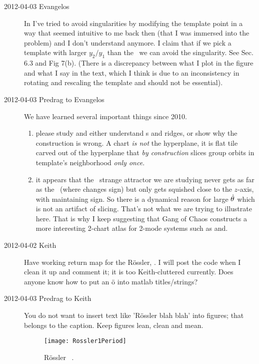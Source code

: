 \begin{description}
\item[2012-04-03 Evangelos]
In  I've tried to avoid singularities by modifying the
template point in a way that seemed intuitive to me back then (that I was immersed
into the problem) and I don't understand anymore. I claim that if we pick a template
with larger $y_2/y_1$ than the \reqv\ we can avoid
the singularity. See Sec. 6.3 and Fig 7(b).
(There is a discrepancy between what I plot in the figure and what I say in the
text, which I think is due to an inconsistency in rotating and rescaling the
template and should not be essential).

\item[2012-04-03 Predrag to Evangelos] We have learned several important things since
2010.
\begin{enumerate}
  \item
    please study and either understand \chartBord s and ridges, or show
    why the construction is wrong. A chart \emph{is not} the hyperplane,
    it is flat tile carved out of the hyperplane that \emph{by construction}
    slices group orbits in template's neighborhood \emph{only once}.
  \item
    it appears that the \cLe\ strange attractor we are studying never
    gets as far as the \chartBord\ (where  changes
    sign) but only gets squished close to the $z$-axis, with
     maintaining sign. So there is a dynamical reason
    for large $\dot{\theta}$ which is not an artifact of slicing. That's
    not what we are trying to illustrate here. That is why I keep
    suggesting that Gang of Chaos constructs a more interesting 2-chart
    atlas for 2-mode systems such as  and.
\end{enumerate}


\item[2012-04-02 Keith] Have working return map for the
R\"ossler, .  I will post the code
when I clean it up and comment it; it is too Keith-cluttered currently.
Does anyone know how to put an \"o into matlab titles/strings?

\item[2012-04-03 Predrag to Keith] You do not want to insert text like
'R\"ossler blah blah' into figures; that belongs to the caption. Keep
figures lean, clean and mean.

\begin{figure}
\begin{center}
\texttt{[image: Rossler1Period]}
\end{center}
  \caption{
R\"ossler \po\ .
  }
\label{fig:Ros1Per}
\end{figure}


\end{description}
